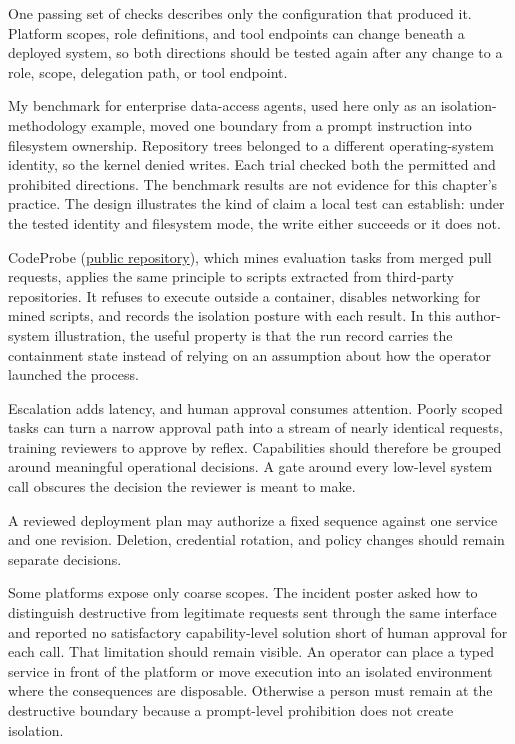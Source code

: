 One passing set of checks describes only the configuration that produced it. Platform scopes, role definitions, and tool endpoints can change beneath a deployed system, so both directions should be tested again after any change to a role, scope, delegation path, or tool endpoint.

My benchmark for enterprise data-access agents, used here only as an isolation-methodology example, moved one boundary from a prompt instruction into filesystem ownership. Repository trees belonged to a different operating-system identity, so the kernel denied writes. Each trial checked both the permitted and prohibited directions. The benchmark results are not evidence for this chapter's practice. The design illustrates the kind of claim a local test can establish: under the tested identity and filesystem mode, the write either succeeds or it does not.

CodeProbe (\href{https://github.com/sjarmak/codeprobe}{public repository}), which mines evaluation tasks from merged pull requests, applies the same principle to scripts extracted from third-party repositories. It refuses to execute outside a container, disables networking for mined scripts, and records the isolation posture with each result. In this author-system illustration, the useful property is that the run record carries the containment state instead of relying on an assumption about how the operator launched the process.

Escalation adds latency, and human approval consumes attention. Poorly scoped tasks can turn a narrow approval path into a stream of nearly identical requests, training reviewers to approve by reflex. Capabilities should therefore be grouped around meaningful operational decisions. A gate around every low-level system call obscures the decision the reviewer is meant to make.

A reviewed deployment plan may authorize a fixed sequence against one service and one revision. Deletion, credential rotation, and policy changes should remain separate decisions.

Some platforms expose only coarse scopes. The incident poster asked how to distinguish destructive from legitimate requests sent through the same interface and reported no satisfactory capability-level solution short of human approval for each call. That limitation should remain visible. An operator can place a typed service in front of the platform or move execution into an isolated environment where the consequences are disposable. Otherwise a person must remain at the destructive boundary because a prompt-level prohibition does not create isolation.

